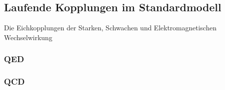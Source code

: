 \clearpage
\subsection{Laufende Kopplungen im Standardmodell}\label{beta_im_SM}

  Die Eichkopplungen der Starken, Schwachen und Elektromagnetischen Wechselwirkung \cite{PDG:QCD}
  
  \subsubsection{QED}
  
  \subsubsection{QCD}
